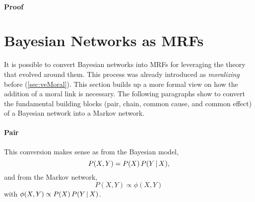 	\paragraph{Proof}

	\section{Bayesian Networks as MRFs}
		\label{sec:towardsMarkovRandomFields}

		It is possible to convert Bayesian networks into MRFs for leveraging the theory that evolved around them. This process was already introduced as \emph{moralizing} before (\autoref{sec:veMoral}).	 This section builds up a more formal view on how the addition of a moral link is necessary. The following paragraphs show to convert the fundamental building blocks (pair, chain, common cause, and common effect) of a Bayesian network into a Markov network.

		\paragraph{Pair}
			\begin{center}
			\end{center}
			This conversion makes sense as from the Bayesian model,
			\begin{equation}
				P(X, Y) = P(X) \, P(Y \,\vert\, X),
			\end{equation}
			and from the Markov network,
			\begin{equation}
				P(X, Y) \propto \phi(X, Y)
			\end{equation}
			with \( \phi(X, Y) \propto P(X) \, P(Y \,\vert\, X) \).

